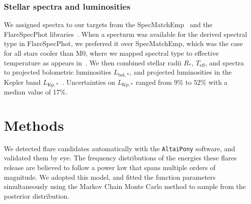 \documentclass{aa}
\begin{document}
\subsubsection{Stellar spectra and luminosities}
\label{sec:lum}
We assigned spectra to our targets from the SpecMatchEmp~\citep{yee_specmatch_2017} and the FlareSpecPhot libraries~\citep{Schmidt2014b, Kirkpatrick2010, Burgasser2007, Burgasser2008, Burgasser2010, Burgasser2004, Cruz2004, Burgasser2006, Rayner2009, Doi2010, Filippazzo2015, Cruz2003, West2011, Bochanski2010,  Bochanski2007, Schmidt2010, Schmidt2015, Schmidt2014a, mann_how_2015}. When a specturm was available for the derived spectral type in FlareSpecPhot, we preferred it over SpecMatchEmp, which was the case for all stars cooler than M0, where we mapped spectral type to effective temperature as appears in~\citet{pecaut_intrinsic_2013}. We then combined stellar radii $R_*$, $T_\mathrm{eff}$, and spectra to projected bolometric luminosities $L_{\mathrm{bol,*}}$, and projected luminosities in the Kepler band $L_{\mathrm{Kp,*}}$~\citep{shibayama2013,ilin_flares_2019}. Uncertainties on $L_{\mathrm{Kp,*}}$ ranged from 9\;\% to 52\;\% with a median value of 17\;\%.
\section{Methods}
\label{sec:methods}
We detected flare candidates automatically with the \texttt{AltaiPony} software, and validated them by eye.  %
The frequency distributions of the energies these flares release are believed to follow a power law that spans multiple orders of magnitude. We adopted this model, and fitted the function parameters simultaneously using the Markov Chain Monte Carlo method to sample from the posterior distribution. 
\end{document}
